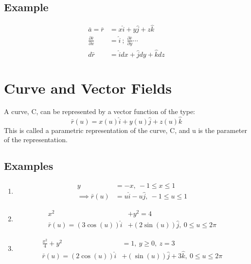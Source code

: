 \documentclass[a4paper, 11pt, normalem]{report}
\newcommand\p{\partial}
\begin{document}
\subsection{Example}
\begin{align*}
    \bar{a} = \bar{r} &= x\hat{i} + y\hat{j} + z\hat{k} \\
    \frac{\p \bar{r}}{\p x} &= \hat{i} ~;~ \frac{\p \bar{r}}{\p y} \cdots \\
    d\bar{r} &= \hat{i}dx + \hat{j}dy + \hat{k}dz
\end{align*}

\section{Curve and Vector Fields}
A curve, C, can be represented by a vector function of the type:
\begin{equation*}
    \bar{r}(u) = x(u)\hat{i} + y(u)\hat{j} + z(u)\hat{k}
\end{equation*}
This is called a parametric representation of the curve, C, and u is the parameter of the representation.

\subsection{Examples}
\begin{enumerate}
    \item
            \begin{align*}
                y &= -x,~ -1 \leq x \leq 1 \\
                \implies \bar{r}(u) &= u\hat{i} - u\hat{j},~ -1 \leq u \leq 1
            \end{align*}
    \item
            \begin{align*}
                x^2 &+ y^2 = 4 \\
                \bar{r}(u) = (3\cos(u))\hat{i} &+ (2\sin(u))\hat{j},~ 0 \leq u \leq 2\pi
            \end{align*}
    \item
            \begin{align*}
                \frac{x^2}{4} + y^2 &= 1,~ y \geq 0,~ z = 3 \\
                \bar{r}(u) = (2\cos(u))\hat{i} &+ (\sin(u))\hat{j} + 3\hat{k},~ 0 \leq u \leq 2\pi
            \end{align*}
\end{enumerate}
\end{document}
